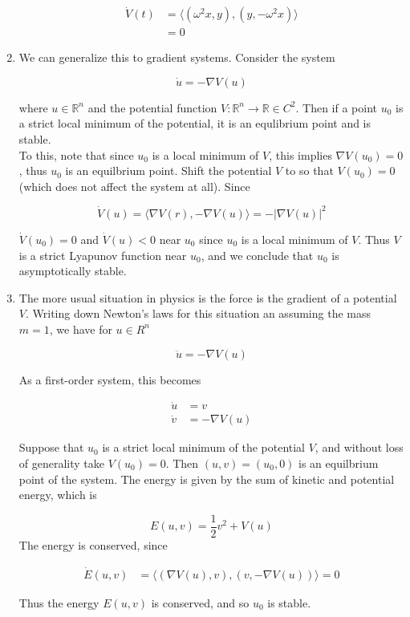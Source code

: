 \documentclass{article}
\def\R{{\mathbb R}}
\begin{document}
\begin{enumerate}
\begin{align*}
\dot{V}(t) &= \langle (\omega^2 x, y), (y, -\omega^2 x) \rangle \\ 
&= 0
\end{align*}

\item We can generalize this to gradient systems. Consider the system

\[
\dot{u} = -\nabla V(u)
\]

where $u \in \R^n$ and the potential function $V:\R^n \rightarrow \R \in C^2$. Then if a point $u_0$ is a strict local minimum of the potential, it is an equlibrium point and is stable.\\

To this, note that since $u_0$ is a local minimum of $V$, this implies $\nabla V(u_0) = 0$, thus $u_0$ is an equilbrium point. Shift the potential $V$ to so that $V(u_0) = 0$ (which does not affect the system at all). Since

\[
\dot{V}(u) = \langle \nabla V(r), -\nabla V(u) \rangle 
= -|\nabla V(u)|^2
\]

$\dot{V}(u_0) = 0$ and $\dot{V}(u) < 0$ near $u_0$ since $u_0$ is a local minimum of $V$. Thus $V$ is a strict Lyapunov function near $u_0$, and we conclude that $u_0$ is asymptotically stable.

\item The more usual situation in physics is the force is the gradient of a potential $V$. Writing down Newton's laws for this situation an assuming the mass $m = 1$, we have for $u \in R^n$

\[
\ddot{u} = -\nabla V(u)
\]

As a first-order system, this becomes

\begin{align*}
\dot{u} &= v \\
\dot{v} &= -\nabla V(u)
\end{align*}

Suppose that $u_0$ is a strict local minimum of the potential $V$, and without loss of generality take $V(u_0) = 0$. Then $(u, v) = (u_0, 0)$ is an equilbrium point of the system. The energy is given by the sum of kinetic and potential energy, which is

\[
E(u, v) = \frac{1}{2} v^2 + V(u)
\]
The energy is conserved, since

\begin{align*}
\dot{E}(u, v) &= \langle (\nabla V(u), v), (v, -\nabla V(u) ) \rangle = 0
\end{align*}

Thus the energy $E(u, v)$ is conserved, and so $u_0$ is stable.

\end{enumerate}
\end{document}

